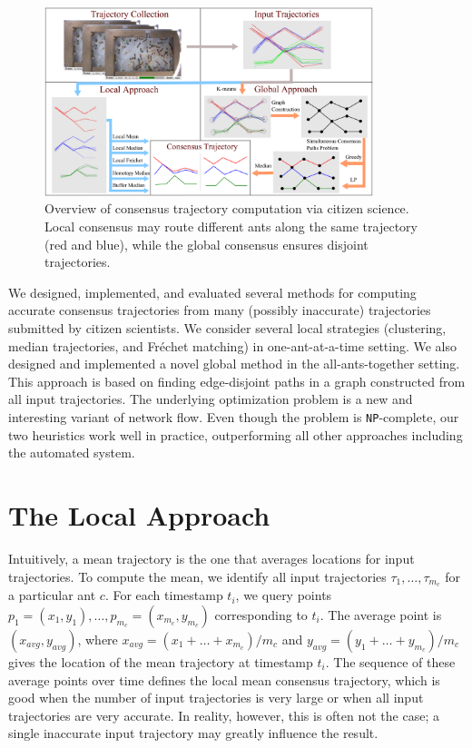 \documentclass{llncs}
\newcommand{\blink}[1]{\textnormal{\texttt{#1}}}
\newcommand{\NPC}[0]{\blink{NP}-complete}
\newcommand{\Frechet}[0]{Fr\'{e}chet}
\begin{document}
\begin{figure}[t]
\centering
\includegraphics[height=5.5cm]{pic/flowchart}
\caption{Overview of consensus trajectory computation via citizen
science. Local consensus may route different ants along  the
same trajectory (red and blue), while the global consensus ensures
disjoint trajectories.}
\label{fig:flow}
\end{figure}
We designed, implemented, and evaluated several methods for
computing accurate consensus trajectories from many (possibly
inaccurate) trajectories submitted by citizen scientists. We
consider several local strategies (clustering, median
trajectories, and \Frechet{} matching) in one-ant-at-a-time setting. We
also designed and implemented
a novel global
method in the all-ants-together setting. This approach is
based on finding edge-disjoint paths in a graph
constructed from all input trajectories. The underlying optimization
problem is a new and interesting variant of network flow. Even though
the problem is \NPC{}, our two heuristics work
well in practice, outperforming all other approaches including the
automated system.

\section{The Local Approach}
\label{sect:local}

Intuitively, a mean trajectory is the one that averages locations for
input trajectories. To compute the mean, we identify all input
trajectories $\tau_1, \dots, \tau_{m_c}$ for a particular ant $c$. For
each timestamp $t_i$, we query points
$p_1=(x_1, y_1), \dots, p_{m_c}=(x_{m_c}, y_{m_c})$ corresponding to
$t_i$. The average point is $(x_{avg}, y_{avg})$,
where $x_{avg}=(x_1 + \dots + x_{m_c})/m_c$ and $y_{avg}=(y_1 + \dots
+ y_{m_c})/m_c$ gives the location of the mean
trajectory at timestamp $t_i$. The sequence of these average points
over time defines the local mean consensus trajectory, which
 is good when the number of input trajectories is
very large or when all input trajectories are very accurate. In
reality, however, this is often not the case; a single
inaccurate input trajectory may greatly influence the result.
\medskip
\end{document}
